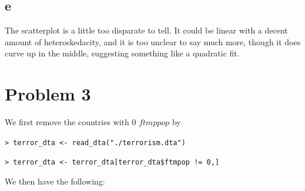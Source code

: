 \documentclass[12pt,letterpaper]{article}
\theoremstyle{definition}
\begin{document}
\subsection*{e}

The scatterplot is a little too disparate to tell. It could be linear with a decent amount of heteroskedacity, and it is too unclear to say much more, though it does curve up in the middle, suggesting something like a quadratic fit.

\section*{Problem 3}

We first remove the countries with 0 $ftmppop$ by

\verb|> terror_dta <- read_dta("./terrorism.dta")|

\verb|> terror_dta <- terror_dta[terror_dta$ftmpop != 0,]|

We then have the following:
\end{document}
